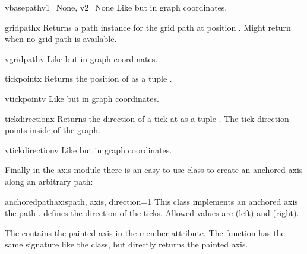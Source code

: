 \begin{methoddesc}[anchoredaxis]{vbasepath}{v1=None, v2=None}
  Like  but in graph coordinates.
\end{methoddesc}

\begin{methoddesc}[anchoredaxis]{gridpath}{x}
  Returns a path instance for the grid path at position .
  Might return  when no grid path is available.
\end{methoddesc}

\begin{methoddesc}[anchoredaxis]{vgridpath}{v}
  Like  but in graph coordinates.
\end{methoddesc}

\begin{methoddesc}[anchoredaxis]{tickpoint}{x}
  Returns the position of  as a tuple .
\end{methoddesc}

\begin{methoddesc}[anchoredaxis]{vtickpoint}{v}
  Like  but in graph coordinates.
\end{methoddesc}

\begin{methoddesc}[anchoredaxis]{tickdirection}{x}
  Returns the direction of a tick at  as a tuple .
  The tick direction points inside of the graph.
\end{methoddesc}

\begin{methoddesc}[anchoredaxis]{vtickdirection}{v}
  Like  but in graph coordinates.
\end{methoddesc}

Finally in the axis module there is an easy to use
 class to create an anchored axis along an
arbitrary path:

\begin{classdesc}{anchoredpathaxis}{path, axis, direction=1}
  This class implements an anchored axis the path .
   defines the direction of the ticks. Allowed values
  are  (left) and  (right).
\end{classdesc}

The  contains the painted axis in the
 member attribute. The function  has
the same signature like the  class, but
directly returns the painted axis. %

